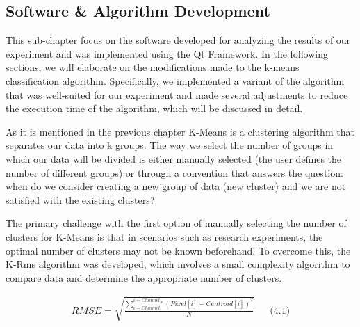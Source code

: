 \documentclass{article}
\begin{document}
{                    \subsection{Software \& Algorithm Development}
                    This sub-chapter focus on the software developed for analyzing the results of our experiment and was implemented using the Qt Framework. In the following sections, we will elaborate on the modifications made to the k-means classification algorithm. Specifically, we implemented a variant of the algorithm that was well-suited for our experiment and made several adjustments to reduce the execution time of the algorithm, which will be discussed in detail.\par
                    As it is mentioned in the previous chapter K-Means is a clustering algorithm that separates our data into k groups. The way we select the number of groups in which our data will be divided is either manually selected (the user defines the number of different groups) or through a convention that answers the question: when do we consider creating a new group of data (new cluster) and we are not satisfied with the existing clusters?\par
                    The primary challenge with the first option of manually selecting the number of clusters for K-Means is that in scenarios such as research experiments, the optimal number of clusters may not be known beforehand. To overcome this, the K-Rms algorithm was developed, which involves a small complexity algorithm to compare data and determine the appropriate number of clusters.
                    
                    \begin{align*}
                        RMSE = \sqrt{\frac{\sum_{i=Channel_1}^{i=Channel_N} (Pixel[i]-Centroid[i])^2}{N}} && \text{(4.1)} 
                    \end{align*}
                    
}
\end{document}
